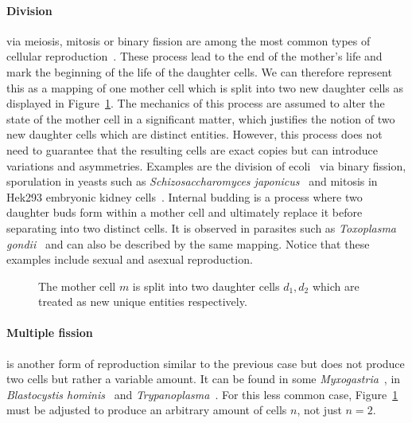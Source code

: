 \paragraph{Division} via meiosis, mitosis or binary fission are among the most common types of
cellular reproduction~\cite{Biov2014,Ilowiecki1981,von1835resp}.
These process lead to the end of the mother's life and mark the beginning of the life of the daughter
cells.
We can therefore represent this as a mapping of one mother cell which is split into two new daughter
cells as displayed in Figure~\ref{fig:theory-division-basic}.
The mechanics of this process are assumed to alter the state of the mother cell in a significant
matter, which justifies the notion of two new daughter cells which are distinct entities.
However, this process does not need to guarantee that the resulting cells are exact copies but can
introduce variations and asymmetries.
Examples are the division of \ac{ecoli}~\cite{Sezonov2007} via binary fission, sporulation in yeasts
such as \textit{Schizosaccharomyces japonicus}~\cite{Neiman2011,Tanaka1982} and mitosis in Hek293
embryonic kidney cells~\cite{Molla2017}.
Internal budding is a process where two daughter buds form within a mother cell
and ultimately replace it before separating into two distinct cells.
It is observed in parasites such as \textit{Toxoplasma gondii}~\cite{Smyth1994} and can also be
described by the same mapping.
Notice that these examples include sexual and asexual reproduction.

\begin{figure}[ht]
    \centering
    \caption[Cellular division with two new unique daughter cells]{
        The mother cell $m$ is split into two daughter cells $d_1,d_2$ which are treated as new
        unique entities respectively.
    }
    \label{fig:theory-division-basic}
\end{figure}

\paragraph{Multiple fission} is another form of reproduction similar to the previous case but does
not produce two cells but rather a variable amount.
It can be found in some \textit{Myxogastria}~\cite{Baldauf1997}, in \textit{Blastocystis
hominis}~\cite{Suresh1994} and \textit{Trypanoplasma}~\cite{Peckov1990}.
For this less common case, Figure~\ref{fig:theory-division-basic} must be adjusted to produce an
arbitrary amount of cells $n$, not just $n=2$.

